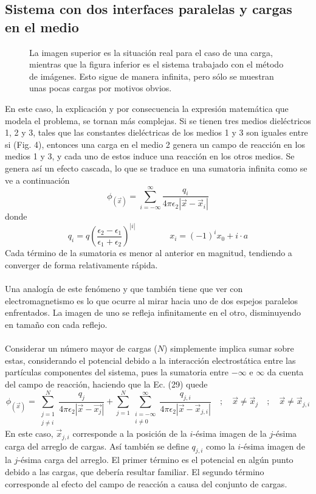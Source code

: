 \documentclass[12pt, notitlepage]{article}
\begin{document}
\subsection{Sistema con dos interfaces paralelas y cargas en el medio}
\begin{figure}[H]
\centering

\caption{La imagen superior es la situación real para el caso de una carga, mientras que la figura inferior es el sistema trabajado con el método de imágenes. Esto sigue de manera infinita, pero sólo se muestran unas pocas cargas por motivos obvios.}
\end{figure}
En este caso, la explicación y por consecuencia la expresión matemática que modela el problema, se tornan más complejas. Si se tienen tres medios dieléctricos 1, 2 y 3, tales que las constantes dieléctricas de los medios 1 y 3 son iguales entre si (Fig. 4), entonces una carga en el medio 2 genera un campo de reacción en los medios 1 y 3, y cada uno de estos induce una reacción en los otros medios. Se genera así un efecto cascada, lo que se traduce en una sumatoria infinita \cite{Pei-kun} como se ve a continuación
\begin{equation}
\phi_{(\vec{x})} = \sum_{i=-\infty}^\infty\frac{q_i}{4\pi\epsilon_2|\vec{x} - \vec{x}_i|}
\end{equation}
donde
\begin{equation*}
q_i = q\left(\frac{\epsilon_2 - \epsilon_1}{\epsilon_1 + \epsilon_2}\right)^{|i|} \qquad\qquad x_i=(-1)^ix_0 + i\cdot a
\end{equation*}
Cada término de la sumatoria es menor al anterior en magnitud, tendiendo a converger de forma relativamente rápida.\\\\
Una analogía de este fenómeno y que también tiene que ver con electromagnetismo es lo que ocurre al mirar hacia uno de dos espejos paralelos enfrentados. La imagen de uno se refleja infinitamente en el otro, disminuyendo en tamaño con cada reflejo.\\\\
Considerar un número mayor de cargas ($N$) simplemente implica sumar sobre estas, considerando el potencial debido a la interacción electrostática entre las partículas componentes del sistema, pues la sumatoria entre $-\infty$ e $\infty$ da cuenta del campo de reacción, haciendo que la Ec. (29) quede
\begin{equation}
\phi_{(\vec{x})} = \sum_{\substack{j = 1\\j\neq i}}^N \frac{q_j}{4\pi\epsilon_2|\vec{x} - \vec{x_j}|} + \sum_{j=1}^N\sum_{\substack{i=-\infty\\i\neq 0}}^\infty\frac{q_{j,i}}{4\pi\epsilon_2|\vec{x} - \vec{x}_{j,i}|}\quad ; \quad \vec{x} \neq \vec{x}_j\quad ; \quad \vec{x} \neq \vec{x}_{j,i}
\end{equation}
En este caso, $\vec{x}_{j,i}$ corresponde a la posición de la $i$-ésima imagen de la $j$-ésima carga del arreglo de cargas. Así también se define $q_{j,i}$ como la $i$-ésima imagen de la $j$-ésima carga del arreglo. El primer término es el potencial en algún punto debido a las cargas, que debería resultar familiar. El segundo término corresponde al efecto del campo de reacción a causa del conjunto de cargas.
\end{document}
